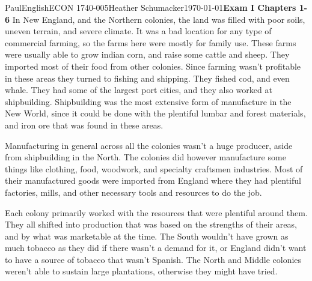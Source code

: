 \documentclass[12pt,letterpaper]{article}
\begin{document}
\begin{mla}{Paul}{English}{ECON 1740-005}{Heather
    Schumacker}{\today}{\textbf{Exam I Chapters 1-6}}
In New England, and the Northern colonies, the land was filled with
poor soils, uneven terrain, and severe climate. It was a bad location
for any type of commercial farming, so the farms here were mostly for
family use. These farms were usually able to grow indian corn, and
raise some cattle and sheep. They imported most of their food from
other colonies. Since farming wasn't profitable in these areas they
turned to fishing and shipping. They fished cod, and even whale. They
had some of the largest port cities, and they also worked at
shipbuilding. Shipbuilding was the most extensive form of manufacture
in the New World, since it could be done with the plentiful lumbar and
forest materials, and iron ore that was found in these areas. 

Manufacturing in general across all the colonies wasn't a huge
producer, aside from shipbuilding in the North. The colonies did
however manufacture some things like clothing, food, woodwork, and
specialty craftsmen industries. Most of their manufactured goods were
imported from England where they had plentiful factories, mills, and
other necessary tools and resources to do the job. 

Each colony primarily worked with the resources that were plentiful
around them. They all shifted into production that was based on the strengths of
their areas, and by what was marketable at the time. The South
wouldn't have grown as much tobacco as they did if there wasn't a
demand for it, or England didn't want to have a source of tobacco that
wasn't Spanish. The North and Middle colonies weren't able to sustain
large plantations, otherwise they might have tried.


\end{mla}
\end{document}
